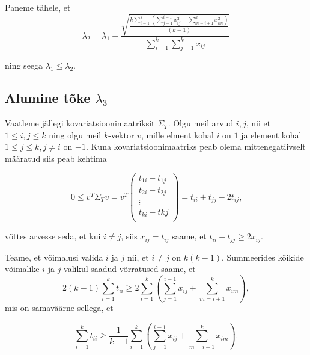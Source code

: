 \documentclass[a4paper,12pt,oneside]{article}
\numberwithin{equation}{section}
\theoremstyle{definition}
\begin{document}
Paneme tähele, et 
\begin{equation*}
\lambda_2 = \lambda_1 + \frac{\sqrt{\frac{ k \sum \limits_{i=1}^k  \left( \sum \limits_{j=1}^{i-1} x_{ij}^2 + \sum \limits_{m=i+1}^k {x_{im}^2} \right)}{\left( k -1 \right)}}}{\sum \limits_{i=1}^k \sum \limits_{j=1}^k x_{ij}}
\end{equation*}

ning seega $\lambda_1 \leq \lambda_2$.

\subsection{Alumine tõke $\lambda_3$}



Vaatleme jällegi kovariatsioonimaatriksit $\Sigma_T$. Olgu meil arvud $i,j$, nii et $1 \leq i,j  \leq k$ ning olgu meil $k$-vektor $v$, mille elment kohal $i$ on $1$ ja element kohal $1 \leq j \leq k, j \neq i$ on $-1$. Kuna kovariatsioonimaatriks peab olema mittenegatiivselt määratud siis peab kehtima

\begin{equation*}
\label{eq:psd 1 -1 vector}
0 \leq v^T \Sigma_T v = v^T 
\begin{pmatrix}
t_{1i} - t_{1j} \\
t_{2i} - t_{2j} \\
\vdots \\
t_{ki} - t{kj} \\
\end{pmatrix}
= t_{ii} + t_{jj} - 2 t_{ij} \text{,}
\end{equation*}

võttes arvesse seda, et kui $i \neq j$, siis $x_{ij} = t_{ij}$ saame, et $t_{ii} + t_{jj} \geq 2 x_{ij}$. 

Teame, et võimalusi valida $i$ ja $j$ nii, et $i \neq j$ on $k \left( k -1 \right)$. Summeerides kõikide võimalike $i$ ja $j$ valikul saadud võrratused saame, et
\begin{equation*}
2 \left( k - 1 \right) \sum \limits_{i=1}^k t_{ii} \geq 2  \sum \limits_{i=1}^k  \left( \sum \limits_{j=1}^{i-1} x_{ij} + \sum \limits_{m=i+1}^k {x_{im}} \right),
\end{equation*}
mis on samaväärne sellega, et

\begin{equation*}
\sum \limits_{i=1}^k t_{ii}  \geq  \frac{1}{k - 1} \sum \limits_{i=1}^k  \left( \sum \limits_{j=1}^{i-1} x_{ij} + \sum \limits_{m=i+1}^k {x_{im}} \right).
\end{equation*}
\end{document}
